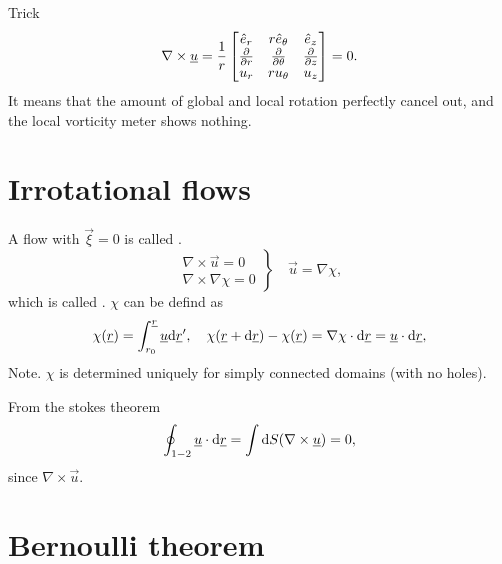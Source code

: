 \documentclass[../main.tex]{subfiles}
\begin{document}
  Trick
  \begin{displaymath}
    \nabla \times \underline{u} = \frac{1}{r} \begin{bmatrix}
      \hat{e}_r & r \hat{e} _\theta & \hat{e}_z\\
      \frac{\partial }{\partial r} & \frac{\partial }{\partial \theta} & \frac{\partial }{\partial z} \\
      u_r & r u_\theta & u_z
    \end{bmatrix} = 0.
  \end{displaymath}
  It means that the amount of global and local rotation perfectly cancel out, and the local vorticity meter 
  shows nothing.

  \section{Irrotational flows}
  
  A flow with $\vec \xi = 0$ is called .
  \begin{displaymath}
    \left.\begin{matrix}
      \nabla \times \vec u = 0 \\
      \nabla \times \nabla \chi = 0 
    \end{matrix}\right\} \quad \vec u =  \nabla \chi,
  \end{displaymath}
  which is called .
  $\chi$ can be defind as
  \begin{displaymath}
    \chi(\underline{r}) = \int_{r_0}^{\underline{r}} \underline{u} \mathrm{d} \underline{r}', 
    \quad \chi(\underline{r} + \mathrm{d} \underline{r}) - \chi(\underline{r}) = \nabla \chi \cdot \mathrm{d} \underline{r} = \underline{u} \cdot \mathrm{d} \underline{r},
  \end{displaymath}
  Note. $\chi$ is determined uniquely for simply connected domains (with no holes).

  From the stokes theorem
  \begin{displaymath}
    \oint_{1-2} \underline{u} \cdot \mathrm{d} \underline{r} = \int\mathrm{d} S( \nabla \times \underline{u}) = 0, 
  \end{displaymath}
  since $\nabla \times \vec u$.
  
  \section{Bernoulli theorem}
\end{document}
